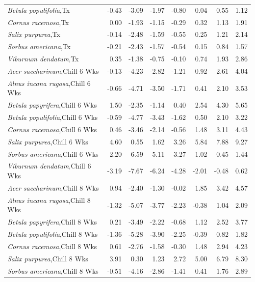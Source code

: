 \documentclass{article}\usepackage[]{graphicx}\usepackage[]{color}
\begin{document}
\begin{longtable}{lrrrrrrr}
  \textit{Betula populifolia},Tx & -0.43 & -3.09 & -1.97 & -0.80 & 0.04 & 0.55 & 1.12 \\ 
  \textit{Cornus racemosa},Tx & 0.00 & -1.93 & -1.15 & -0.29 & 0.32 & 1.13 & 1.91 \\ 
  \textit{Salix purpurea},Tx & -0.14 & -2.48 & -1.59 & -0.55 & 0.25 & 1.21 & 2.14 \\ 
  \textit{Sorbus americana},Tx & -0.21 & -2.43 & -1.57 & -0.54 & 0.15 & 0.84 & 1.57 \\ 
  \textit{Viburnum dendatum},Tx & 0.35 & -1.38 & -0.75 & -0.10 & 0.74 & 1.93 & 2.86 \\ 
  \textit{Acer saccharinum},Chill 6 Wks & -0.13 & -4.23 & -2.82 & -1.21 & 0.92 & 2.61 & 4.04 \\ 
  \textit{Alnus incana rugosa},Chill 6 Wks & -0.66 & -4.71 & -3.50 & -1.71 & 0.41 & 2.10 & 3.53 \\ 
  \textit{Betula papyrifera},Chill 6 Wks & 1.50 & -2.35 & -1.14 & 0.40 & 2.54 & 4.30 & 5.65 \\ 
  \textit{Betula populifolia},Chill 6 Wks & -0.59 & -4.77 & -3.43 & -1.62 & 0.50 & 2.10 & 3.22 \\ 
  \textit{Cornus racemosa},Chill 6 Wks & 0.46 & -3.46 & -2.14 & -0.56 & 1.48 & 3.11 & 4.43 \\ 
  \textit{Salix purpurea},Chill 6 Wks & 4.60 & 0.55 & 1.62 & 3.26 & 5.84 & 7.88 & 9.27 \\ 
  \textit{Sorbus americana},Chill 6 Wks & -2.20 & -6.59 & -5.11 & -3.27 & -1.02 & 0.45 & 1.44 \\ 
  \textit{Viburnum dendatum},Chill 6 Wks & -3.19 & -7.67 & -6.24 & -4.28 & -2.01 & -0.48 & 0.62 \\ 
  \textit{Acer saccharinum},Chill 8 Wks & 0.94 & -2.40 & -1.30 & -0.02 & 1.85 & 3.42 & 4.57 \\ 
  \textit{Alnus incana rugosa},Chill 8 Wks & -1.32 & -5.07 & -3.77 & -2.23 & -0.38 & 1.04 & 2.09 \\ 
  \textit{Betula papyrifera},Chill 8 Wks & 0.21 & -3.49 & -2.22 & -0.68 & 1.12 & 2.52 & 3.77 \\ 
  \textit{Betula populifolia},Chill 8 Wks & -1.36 & -5.28 & -3.90 & -2.25 & -0.39 & 0.82 & 1.82 \\ 
  \textit{Cornus racemosa},Chill 8 Wks & 0.61 & -2.76 & -1.58 & -0.30 & 1.48 & 2.94 & 4.23 \\ 
  \textit{Salix purpurea},Chill 8 Wks & 3.91 & 0.30 & 1.23 & 2.72 & 5.00 & 6.79 & 8.30 \\ 
  \textit{Sorbus americana},Chill 8 Wks & -0.51 & -4.16 & -2.86 & -1.41 & 0.41 & 1.76 & 2.89 \\ 

\end{longtable}
\end{document}
